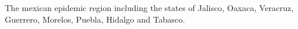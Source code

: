 The mexican epidemic region including the states of Jalisco, Oaxaca, Veracruz, Guerrero, Morelos, Puebla, Hidalgo and Tabasco.